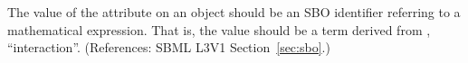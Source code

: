 The value of the attribute  on an \Event object should be
an SBO identifier referring to a mathematical expression.  That is, the
value should be a term derived from \sbointeractionID,
``interaction''.  (References: SBML L3V1 Section~\ref{sec:sbo}.)
